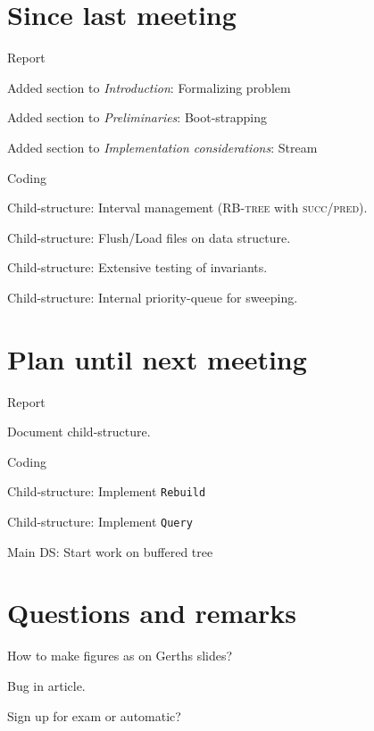 \documentclass[a4paper,11pt,agenda]{meetingmins}
\begin{document}
\maketitle

\section{Since last meeting}
\begin{items}
\item Report
	\begin{items}
		\item Added section to \textit{Introduction}: Formalizing problem
		\item Added section to \textit{Preliminaries}: Boot-strapping
		\item Added section to \textit{Implementation considerations}: Stream
	\end{items}
\item Coding
	\begin{items}
		\item Child-structure: Interval management (\textsc{RB-tree} with \textsc{succ}/\textsc{pred}).
		\item Child-structure: Flush/Load files on data structure.
		\item Child-structure: Extensive testing of invariants.
		\item Child-structure: Internal priority-queue for sweeping.
	\end{items}
\end{items}

\section{Plan until next meeting}
\begin{items}
\item Report
	\begin{items}
		\item Document child-structure.
	\end{items}
\item Coding
	\begin{items}
		\item Child-structure: Implement \texttt{Rebuild}
		\item Child-structure: Implement \texttt{Query}
		\item Main DS: Start work on buffered tree
	\end{items}
\end{items}

\section{Questions and remarks}
\begin{items}
	\item How to make figures as on Gerths slides?
	\item Bug in article.
	\item Sign up for exam or automatic?
\end{items}
\end{document}
